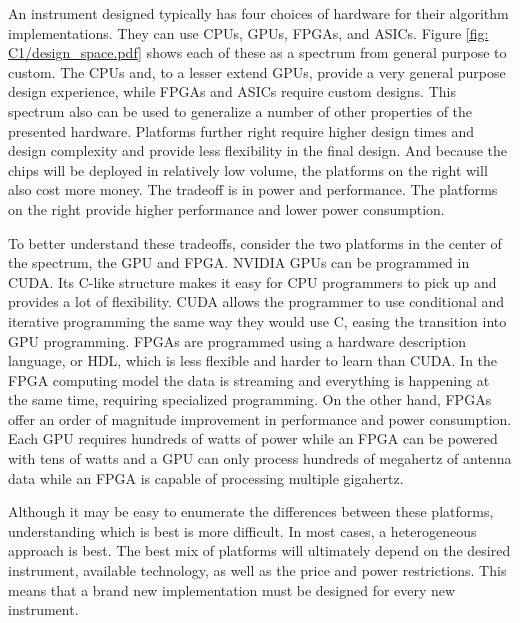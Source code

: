 An instrument designed typically has four choices of hardware for their algorithm implementations. 
They can use CPUs, GPUs, FPGAs, and ASICs.
Figure \ref{fig: C1/design_space.pdf} shows each of these as a spectrum from general purpose to custom.
The CPUs and, to a lesser extend GPUs, provide a very general purpose design experience, while FPGAs and ASICs require custom designs.
This spectrum also can be used to generalize a number of other properties of the presented hardware.
Platforms further right require higher design times and design complexity and provide less flexibility in the final design.
And because the chips will be deployed in relatively low volume, the platforms on the right will also cost more money. 
The tradeoff is in power and performance. 
The platforms on the right provide higher performance and lower power consumption.

To better understand these tradeoffs, consider the two platforms in the center of the spectrum, the GPU and FPGA.
NVIDIA GPUs can be programmed in CUDA.
Its C-like structure makes it easy for CPU programmers to pick up and provides a lot of flexibility. 
CUDA allows the programmer to use conditional and iterative programming the same way they would use C, easing the transition into GPU programming.
FPGAs are programmed using a hardware description language, or HDL, which is less flexible and harder to learn than CUDA.
In the FPGA computing model the data is streaming and everything is happening at the same time, requiring specialized programming.
On the other hand, FPGAs offer an order of magnitude improvement in performance and power consumption.
Each GPU requires hundreds of watts of power while an FPGA can be powered with tens of watts and a GPU can only process hundreds of megahertz of antenna data while an FPGA is capable of processing multiple gigahertz.

Although it may be easy to enumerate the differences between these platforms, understanding which is best is more difficult.
In most cases, a heterogeneous approach is best. 
The best mix of platforms will ultimately depend on the desired instrument, available technology, as well as the price and power restrictions.
This means that a brand new implementation must be designed for every new instrument.

